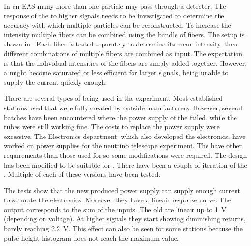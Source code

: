 In an EAS many more than one particle may pass through a detector. The
response of the \pmt to higher signals needs to be investigated to
determine the accuracy with which multiple particles can be
reconstructed. To increase the intensity multiple fibers can be combined
using the bundle of fibers. The setup is shown in . Each fiber is tested separately to determine
its mean intensity, then different combinations of multiple fibers are
combined as input. The expectation is that the individual intensities of
the fibers are simply added together. However, a \pmt might become
saturated or less efficient for larger signals, being unable to supply
the current quickly enough.

There are several types of \pmt being used in the \hisparc experiment.
Most established stations used \pmts that were fully created by outside
manufacturers. However, several batches have been encountered where the
power supply of the \pmt failed, while the tubes were still working
fine. The costs to replace the power supply were excessive. The \nikhef
Electronics department, which also developed the \hisparc electronics,
have worked on \pmt power supplies for the \kmnet neutrino telescope
experiment. The \kmnet \pmts have other requirements than those used for
\hisparc so some modifications were required. The \kmnet design has been
modified to be suitable for \hisparc. There have been a couple of
iteration of the \hisparc \pmts. Multiple \pmts of each of these
versions have been tested.

The tests show that the new \nikhef produced \pmt power supply can
supply enough current to saturate the \hisparc electronics. Moreover
they have a lineair response curve. The output corresponds to the sum of
the inputs. The old \pmts are lineair up to \SI{1}{\volt} (depending on
voltage). At higher signals they start showing diminishing returns,
barely reaching \SI{2.2}{\volt}. This effect can also be seen for some
\hisparc stations because the pulse height histogram does not reach the
maximum \adc value.

